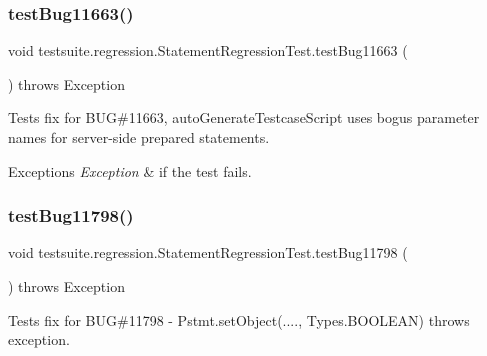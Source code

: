\mbox{\label{classtestsuite_1_1regression_1_1_statement_regression_test_aad9a4a5d28e804097e535c055838a4e6}} 
\subsubsection{\texorpdfstring{test\+Bug11663()}{testBug11663()}}
{\footnotesize\ttfamily void testsuite.\+regression.\+Statement\+Regression\+Test.\+test\+Bug11663 (\begin{DoxyParamCaption}{ }\end{DoxyParamCaption}) throws Exception}

Tests fix for B\+UG\#11663, auto\+Generate\+Testcase\+Script uses bogus parameter names for server-\/side prepared statements.


\begin{DoxyExceptions}{Exceptions}
{\em Exception} & if the test fails. \\
\hline
\end{DoxyExceptions}
\mbox{\label{classtestsuite_1_1regression_1_1_statement_regression_test_a2e9381e517b516fe84e4574229646579}} 
\subsubsection{\texorpdfstring{test\+Bug11798()}{testBug11798()}}
{\footnotesize\ttfamily void testsuite.\+regression.\+Statement\+Regression\+Test.\+test\+Bug11798 (\begin{DoxyParamCaption}{ }\end{DoxyParamCaption}) throws Exception}

Tests fix for B\+UG\#11798 -\/ Pstmt.\+set\+Object(...., Types.\+B\+O\+O\+L\+E\+AN) throws exception.


